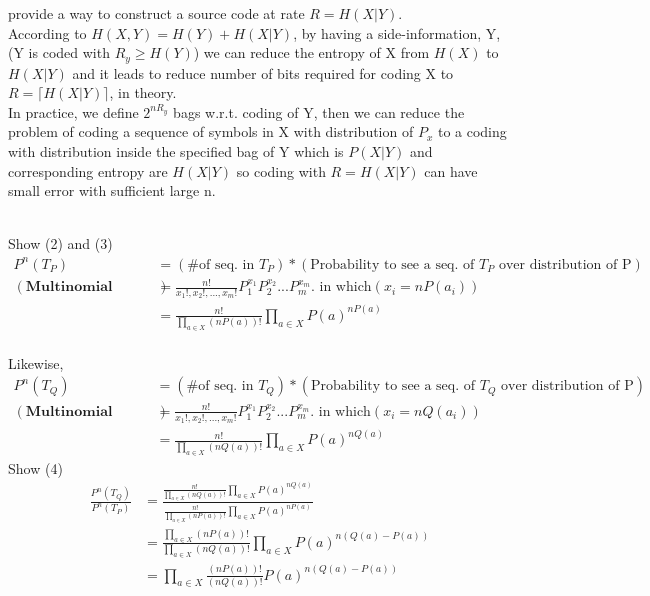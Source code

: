 \documentclass[
  course = {{EE623 Information Theory}},
  quartile = {{4}},
  assignment = 4,
  name = {{Mohammad Mahdi Rahimi}},
  studentnumber = {{20208244}},
  email = {{mahi@kaist.ac.kr}},
  firstexercise = 1
]{aga-homework}
\begin{document}
\exercise
\subexercise provide a way to construct a source code at rate $R = H(X|Y)$.\\


According to $H(X,Y) = H(Y) + H(X|Y)$, by having a side-information, Y, (Y is coded with $R_y \ge H(Y)$) we can reduce the entropy of X from $H(X)$ to $H(X|Y)$ and it leads to reduce number of bits required for coding X to $R = \lceil H(X|Y) \rceil$, in theory.\\

In practice, we define $2^{nR_y}$ bags w.r.t. coding of Y, then we can reduce the problem of coding a sequence of symbols in X with distribution of $P_x$ to a coding with distribution inside the specified bag of Y which is $P(X|Y)$ and corresponding entropy are $H(X|Y)$ so coding with $R = H(X|Y)$ can have small error with sufficient large n.

\\
\exercise
\subexercise Show (2) and (3)
\begin{equation} \label{eq3}
\begin{split}
P^n(T_P) & = (\text{\# of seq. in }T_P) * (\text{Probability to see a seq. of } T_P \text{ over distribution of P})\\
(\textbf{Multinomial distribution})& = \frac{n!}{x_1!, x_2!, ..., x_m!}P^{x_1}_1P^{x_2}_2...P^{x_m}_m. \text{ in which} (x_i = nP(a_i))\\
& = \frac{n!}{\prod_{a \in X} (nP(a))!}\prod_{a \in X} P(a)^{nP(a)}
\end{split}
\end{equation}\\
Likewise,\\
\begin{equation} \label{eq3}
\begin{split}
P^n(T_Q) & = (\text{\# of seq. in }T_Q) * (\text{Probability to see a seq. of } T_Q \text{ over distribution of P})\\
(\textbf{Multinomial distribution})& = \frac{n!}{x_1!, x_2!, ..., x_m!}P^{x_1}_1P^{x_2}_2...P^{x_m}_m. \text{ in which} (x_i = nQ(a_i))\\
& = \frac{n!}{\prod_{a \in X} (nQ(a))!}\prod_{a \in X} P(a)^{nQ(a)}
\end{split}
\end{equation}
\subexercise Show (4)\\
\begin{equation} \label{eq3}
\begin{split}
\frac{P^n(T_Q)}{P^n(T_P)} & = \frac{\frac{n!}{\prod_{a \in X} (nQ(a))!}\prod_{a \in X} P(a)^{nQ(a)}} {\frac{n!}{\prod_{a \in X} (nP(a))!}\prod_{a \in X} P(a)^{nP(a)}}\\
& =  \frac{\prod_{a \in X} (nP(a))!} {\prod_{a \in X} (nQ(a))!} \prod_{a \in X} P(a)^{n(Q(a) - P(a))}\\
& = \prod_{a \in X} \frac{ (nP(a))!} {(nQ(a))!} P(a)^{n(Q(a) - P(a))}
\end{split}
\end{equation}
\end{document}
